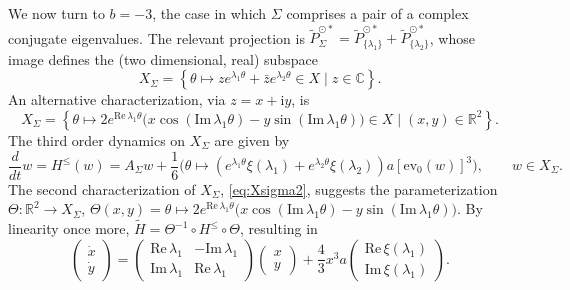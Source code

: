 \documentclass[a4paper, 12pt, oneside, reqno, notitlepage]{amsart}
\theoremstyle{plain}
\theoremstyle{definition}
\theoremstyle{remark}
\begin{document}
We now turn to $b = -3$, the case in which $\Sigma$ comprises a pair of a complex conjugate eigenvalues.
The relevant projection is $\widetilde{P}^{\odot *}_\Sigma = \widetilde{P}^{\odot *}_{\{\lambda_1\}}+\widetilde{P}^{\odot *}_{\{\lambda_2\}}$, whose image defines the (two dimensional, real) subspace 
\begin{equation}
    X_\Sigma = \left\{ \theta \mapsto ze^{\lambda_1 \theta} + \bar{z}  e^{\lambda_2 \theta} \in X \; \big| \;  z \in \mathbb{C} \right\}. 
    \label{eq:Xsigma_z}
\end{equation}
An alternative characterization, via $z = x+\mathrm{i}y$, is
\begin{equation}
    X_\Sigma = \left\{ \theta \mapsto 2 e^{\mathrm{Re} \, \lambda_1 \theta} \big(x \cos (\mathrm{Im} \, \lambda_1 \theta) -y\sin (\mathrm{Im} \, \lambda_1 \theta)  \big)  \in X \; \big| \;  (x,y)\in \mathbb{R}^2 \right\}. 
    \label{eq:Xsigma2}
\end{equation}
The third order dynamics on $X_\Sigma$ are given by
\begin{displaymath}
    \frac{d}{dt} w = H^\leq(w) =A_\Sigma w + \frac16 \big(\theta \mapsto  (e^{\lambda_1 \theta} \xi(\lambda_1) +e^{\lambda_2 \theta} \xi(\lambda_2)) a[\mathrm{ev}_0(w)]^3\big), \qquad w \in X_\Sigma.
\end{displaymath}
The second characterization of $X_\Sigma$, \eqref{eq:Xsigma2}, suggests the parameterization $\Theta: \mathbb{R}^2 \to X_\Sigma$, $\Theta(x,y) =\theta \mapsto 2 e^{\mathrm{Re} \, \lambda_1 \theta} \big(x \cos (\mathrm{Im} \, \lambda_1 \theta) -y\sin (\mathrm{Im} \, \lambda_1 \theta)  \big) $.
By linearity once more, $\widetilde{H} = \Theta^{-1} \circ H^\leq \circ \Theta$, resulting in
\begin{equation}
    \begin{pmatrix}
        \dot{x} \\ \dot{y}
    \end{pmatrix}
    =
    \begin{pmatrix}
    \mathrm{Re} \, \lambda_1 & - \mathrm{Im} \, \lambda_1 \\
    \mathrm{Im} \, \lambda_1 & \mathrm{Re} \, \lambda_1
    \end{pmatrix}
    \begin{pmatrix}
        x \\ y
    \end{pmatrix}
    +
    \frac43 x^3 a 
    \begin{pmatrix}
        \mathrm{Re} \, \xi(\lambda_1) \\ \mathrm{Im} \, \xi(\lambda_1)
    \end{pmatrix}.
    \label{eq:R2dynamics}
\end{equation}
\end{document}
